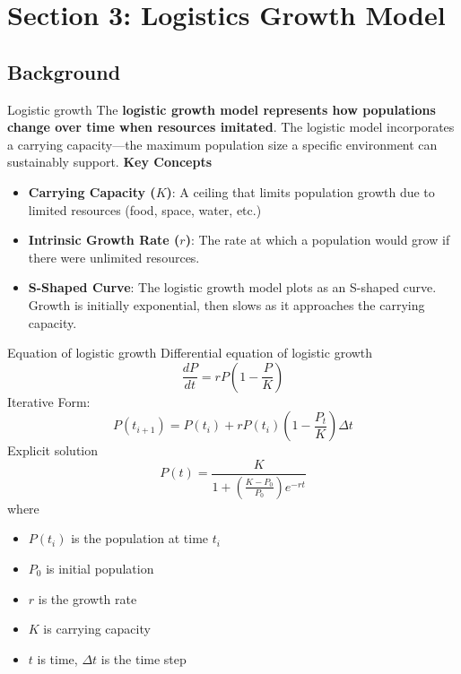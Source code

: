 \section{Section 3: Logistics Growth Model}
\subsection{Background}
\begin{frame}{Logistic growth}
    The \textbf{logistic growth model represents how populations change over time when resources imitated}.  The logistic model incorporates a carrying capacity—the maximum population size a specific environment can sustainably support.
\pause
\vfill
\textbf{Key Concepts}

\begin{itemize}
    \item \textbf{Carrying Capacity ($K$)}: A ceiling that limits population growth due to limited resources  (food, space, water, etc.)
    \pause
    \item \textbf{Intrinsic Growth Rate ($r$)}: The rate at which a population would grow if there were unlimited resources.
    \pause
    \item \textbf{S-Shaped Curve}: The logistic growth model plots as an S-shaped curve. Growth is initially exponential, then slows as it approaches the carrying capacity.
\end{itemize}

\end{frame}

\begin{frame}{Equation of logistic growth}
\footnotesize
Differential equation of logistic growth
\begin{equation*}
       \frac{dP}{dt} = rP\left(1 - \frac{P}{K}\right)
\end{equation*}
\pause
Iterative Form:
\begin{equation*}
 P(t_{i+1}) = P(t_i) + rP(t_i)\left(1 - \frac{P_t}{K}\right) \Delta t
\end{equation*}
\pause
Explicit solution
\begin{equation*}
P(t) = \frac{K}{1 + \left(\frac{K - P_0}{P_0} \right) e^{-rt}}
\end{equation*}
\pause
where 
\begin{itemize}
    \item $P(t_i)$ is the population at time $t_i$
    \pause
    \item $P_0$ is initial population
    \pause
    \item $r$ is the growth rate
    \pause
    \item $K$ is carrying capacity
    \pause
    \item $t$ is time, $\Delta t$ is the time step
\end{itemize}
\end{frame}


